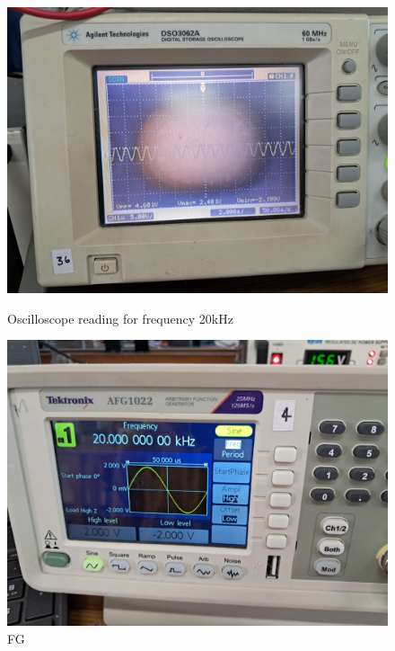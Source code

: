 \documentclass[a4paper,12pt]{article}
\begin{document}
\begin{figure}[H]
    \centering
    \begin{minipage}[b]{0.45\textwidth}
        \centering
        \includegraphics[width=\textwidth]{fig/bp/20ko.jpeg}
        \caption{Oscilloscope reading for frequency 20kHz}
    \end{minipage}
    \hfill
    \begin{minipage}[b]{0.45\textwidth}
        \centering
        \includegraphics[width=\textwidth]{fig/bp/20k.jpeg}
        \caption{FG}
    \end{minipage}
\end{figure}
\end{document}
